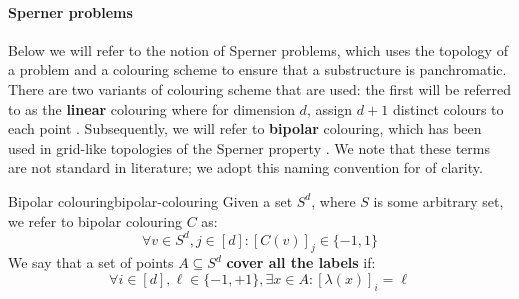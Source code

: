 %
%

\paragraph{Sperner problems}

Below we will refer to the notion of Sperner problems, which uses
the topology of a problem and a colouring scheme to ensure
that a substructure is panchromatic. There are two variants of colouring scheme
that are used: the first will be referred to as the \textbf{linear} colouring
where for dimension $d$, assign $d+1$ distinct colours to each point \cite{daskalakis_ComplexityComputingNash_2006, chen_Complexity2DDiscrete_2009}.
Subsequently, we will refer to \textbf{bipolar} colouring, which has been used in grid-like topologies of the Sperner property
\cite{chen_SettlingComplexityComputing_2009, deligkas_PureCircuitTightInapproximability_2024, daskalakis_ComplexityConstrainedMinmax_2021}.
We note that these terms are not standard in literature; we adopt this naming convention
for of clarity.



\begin{definitionbox}{Bipolar colouring}{bipolar-colouring}
	Given a set $S^d$, where $S$ is some arbitrary set, we refer
	to bipolar colouring $C$ as:
	$$
		\forall v \in S^d, j \in [d]: [C(v)]_j \in \{-1,1\}
	$$
	We say that a set of points $A \subseteq S^d$ \textbf{cover all the labels} if:
	$$
		\forall i \in [d], \ell \in \{-1, +1\}, \exists x \in A: [\lambda(x)]_{i} = \ell
	$$

\end{definitionbox}

